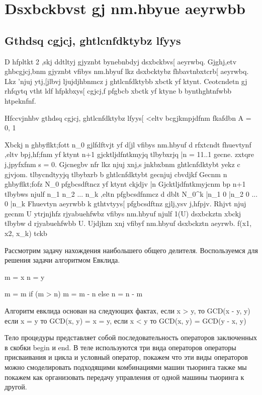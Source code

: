 \section{Dsxbckbvst gj nm.hbyue aeyrwbb}

\subsection{Gthdsq cgjcj, ghtlcnfdktybz lfyys}

D hfpltkt 2 ,skj ddtltyj gjyznbt bynebnbdyj dsxbckbvs[ aeyrwbq. Gjghj,etv ghbcgjcj,bnm gjyznbt vfibys nm.hbyuf lkz dsxbcktybz fhbavtnbxtcrb[ aeyrwbq.
Lkz 'njuj ytj,[jlbvj ljujdjhbnmcz j ghtlcnfdktybb xbctk yf ktynt. Ceotcndetn gj rhfqytq vtht ldf hfpkbxys[ cgjcj,f pfgbcb xbctk yf ktyne b bynthghtnfwbb htpeknfnf.

Hfccvjnhbv gthdsq cgjcj, ghtlcnfdktybz lfyys[ <eltv bcgjkmpjdfnm fkafdbn A = {0, 1}

Xbckj n ghbyflkt;fott n_0 gjlfdftvjt yf d[jl vfibys nm.hbyuf d rfxtcndt fhuevtynf ,eltv bpj,hf;fnm yf ktynt n+1 gjcktljdfntkmyjq tlbybxrjq
\bar{n} = 11..1 gecne. zxtqre j,jpyfxfnm s = 0. Gjcnegbv nfr lkz njuj xnj,s jnkbxbnm ghtlcnfdktybt yekz c gjvjom. tlbycndtyyjq tlbybxrb b ghtlcnfdktybt gecnjuj cbvdjkf
Gecnm n ghbyflkt;fofz N_0 pfgbcsdftncz yf ktynt ckjdjv \bar{n}
Gjcktljdfntkmyjcnm bp n+1 tlbybws njulf n_1 n_2 ... n_k ,eltn pfgbcsdfnmcz d dblt N_0^k \bar{n_1} 0 \bar{n_2} 0 ... 0 \bar{n_k}
Fhuevtyn aeyrwbb k gthtvtyys[ pfgbcsdftnz gjlj,ysv j,hfpjv. Rhjvt njuj gecnm U ytrjnjhfz rjyabuehfwbz vfibys nm.hbyuf njulf 1(U) dsxbckztn xbckj tlbybw d rjyabuehfwbb U. Ujdjhzn xnj vfibyf nm.hbyuf dsxbckztn aeyrwb.  f(x1, x2, x_k) tckb


Рассмотрим задачу нахождения наибольшего общего делителя.
Воспользуемся для решения задачи алгоритмом Евклида.

m = x
n = y

m = m
if (m > n) {
	m = m - n	
} else {
	n = n - m
}

Алгоритм евклида основан на следующих фактах, если x > y, то GCD(x - y, y) если x = y то GCD(x, y) = x = y, если x < y то GCD(x, y) = GCD(y - x, y)

Тело процедуры представляет собой последовательность операторов заключенных в скобки begin и end.
В теле используются три вида операторов операторы присваивания и цикла и условный оператор, покажем что эти виды операторов можно смоделировать подходящими комбинациями машин тьюринга также мы покажем как организовать передачу управления от одной машины тьюринга к другой.


